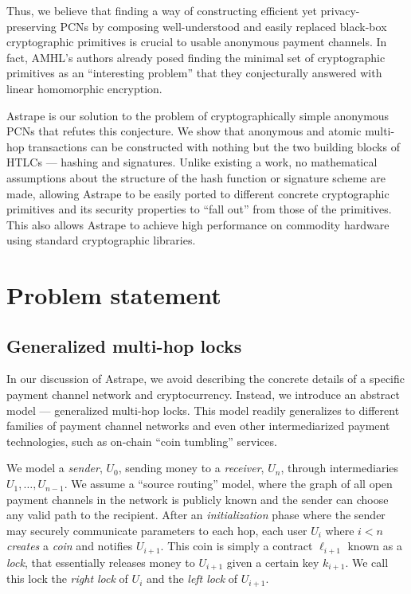 \documentclass[USenglish,oneside,twocolumn]{article}
\begin{document}
Thus, we believe that finding a way of constructing efficient yet privacy-preserving PCNs by composing well-understood and easily replaced black-box cryptographic primitives is crucial to usable anonymous payment channels. In fact, AMHL's authors already posed finding the minimal set of cryptographic primitives as an ``interesting problem'' \cite{malavolta2019anonymous} that they conjecturally answered with linear homomorphic encryption.

Astrape is our solution to the problem of cryptographically simple anonymous PCNs that refutes this conjecture. We show that anonymous and atomic multi-hop transactions can be constructed with nothing but the two building blocks of HTLCs --- hashing and signatures. Unlike existing a work, no mathematical assumptions about the structure of the hash function or signature scheme are made, allowing Astrape to be easily ported to different concrete cryptographic primitives and its security properties to ``fall out'' from those of the primitives. This also allows Astrape to achieve high performance on commodity hardware using standard cryptographic libraries.

\section{Problem statement} \label{sec:probstat}

\subsection{Generalized multi-hop locks}

In our discussion of Astrape, we avoid describing the concrete details of a specific payment channel network and cryptocurrency. Instead, we introduce an abstract model --- generalized multi-hop locks.  This model readily generalizes to different families of payment channel networks and even other intermediarized payment technologies, such as on-chain ``coin tumbling'' services.

We model a \emph{sender}, $U_0$, sending money to a \emph{receiver}, $U_n$, through intermediaries $U_1,\dots,U_{n-1}$. We assume a ``source routing'' model, where the graph of all open payment channels in the network is publicly known and the sender can choose any valid path to the recipient. After an \emph{initialization} phase where the sender may securely communicate parameters to each hop, each user $U_i$ where $i<n$ \emph{creates} a \emph{coin} and notifies $U_{i+1}$. This coin is simply a contract $\ell_{i+1}$ known as a \emph{lock}, that essentially releases money to $U_{i+1}$ given a certain key $k_{i+1}$. We call this lock the \emph{right lock} of $U_{i}$ and the \emph{left lock} of $U_{i+1}$.
\end{document}
